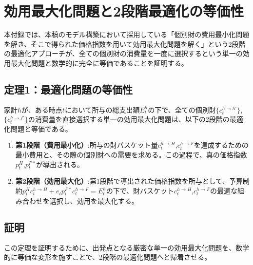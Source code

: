 
\chapter{効用最大化問題と2段階最適化の等価性}
\label{chap:appendix_equivalence}

本付録では、本稿のモデル構築において採用している「個別財の費用最小化問題を解き、そこで得られた価格指数を用いて効用最大化問題を解く」という2段階の最適化アプローチが、全ての個別財の消費量を一度に選択するという単一の効用最大化問題と数学的に完全に等価であることを証明する。

\section*{定理1：最適化問題の等価性}
\label{sec:appendix_equivalence_theorem1}

家計\(h\)が、ある時点\(t\)において所与の総支出額\(E_t^h\)の下で、全ての個別財\(\{c_t^{h\to h'}\}\),\(\{c_t^{h\to f'}\}\)の消費量を直接選択する単一の効用最大化問題は、以下の2段階の最適化問題と等価である。
\begin{enumerate}
    \item\label{itm:appendix_equivalence_theorem1_step1}\textbf{第1段階（費用最小化）}:所与の財バスケット量\(c_t^{h\to H}\),\(c_t^{h\to F}\)を達成するための最小費用と、その際の個別財への需要を求める。この過程で、真の価格指数\(p_t^H\),\(p_t^{F*}\)が導出される。
    \item\label{itm:appendix_equivalence_theorem1_step2}\textbf{第2段階（効用最大化）}:第1段階で導出された価格指数を所与として、予算制約\(p_t^Hc_t^{h\to H}+e_tp_t^{F*}c_t^{h\to F}=E_t^h\)の下で、財バスケット\(c_t^{h\to H}\),\(c_t^{h\to F}\)の最適な組み合わせを選択し、効用を最大化する。
\end{enumerate}

\section*{証明}
\label{sec:appendix_equivalence_proof}

この定理を証明するために、出発点となる厳密な単一の効用最大化問題を、数学的に等価な変形を施すことで、2段階の最適化問題へと帰着させる。

